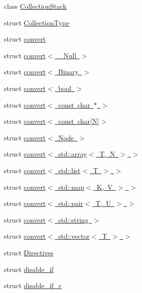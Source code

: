 \begin{DoxyCompactItemize}
class \mbox{\hyperlink{class_y_a_m_l_1_1_collection_stack}{Collection\+Stack}}
\item 
struct \mbox{\hyperlink{struct_y_a_m_l_1_1_collection_type}{Collection\+Type}}
\item 
struct \mbox{\hyperlink{struct_y_a_m_l_1_1convert}{convert}}
\item 
struct \mbox{\hyperlink{struct_y_a_m_l_1_1convert_3_01___null_01_4}{convert$<$ \+\_\+\+Null $>$}}
\item 
struct \mbox{\hyperlink{struct_y_a_m_l_1_1convert_3_01_binary_01_4}{convert$<$ Binary $>$}}
\item 
struct \mbox{\hyperlink{struct_y_a_m_l_1_1convert_3_01bool_01_4}{convert$<$ bool $>$}}
\item 
struct \mbox{\hyperlink{struct_y_a_m_l_1_1convert_3_01const_01char_01_5_01_4}{convert$<$ const char $\ast$ $>$}}
\item 
struct \mbox{\hyperlink{struct_y_a_m_l_1_1convert_3_01const_01char[_n]_4}{convert$<$ const char\mbox{[}\+N\mbox{]}$>$}}
\item 
struct \mbox{\hyperlink{struct_y_a_m_l_1_1convert_3_01_node_01_4}{convert$<$ Node $>$}}
\item 
struct \mbox{\hyperlink{struct_y_a_m_l_1_1convert_3_01std_1_1array_3_01_t_00_01_n_01_4_01_4}{convert$<$ std\+::array$<$ T, N $>$ $>$}}
\item 
struct \mbox{\hyperlink{struct_y_a_m_l_1_1convert_3_01std_1_1list_3_01_t_01_4_01_4}{convert$<$ std\+::list$<$ T $>$ $>$}}
\item 
struct \mbox{\hyperlink{struct_y_a_m_l_1_1convert_3_01std_1_1map_3_01_k_00_01_v_01_4_01_4}{convert$<$ std\+::map$<$ K, V $>$ $>$}}
\item 
struct \mbox{\hyperlink{struct_y_a_m_l_1_1convert_3_01std_1_1pair_3_01_t_00_01_u_01_4_01_4}{convert$<$ std\+::pair$<$ T, U $>$ $>$}}
\item 
struct \mbox{\hyperlink{struct_y_a_m_l_1_1convert_3_01std_1_1string_01_4}{convert$<$ std\+::string $>$}}
\item 
struct \mbox{\hyperlink{struct_y_a_m_l_1_1convert_3_01std_1_1vector_3_01_t_01_4_01_4}{convert$<$ std\+::vector$<$ T $>$ $>$}}
\item 
struct \mbox{\hyperlink{struct_y_a_m_l_1_1_directives}{Directives}}
\item 
struct \mbox{\hyperlink{struct_y_a_m_l_1_1disable__if}{disable\+\_\+if}}
\item 
struct \mbox{\hyperlink{struct_y_a_m_l_1_1disable__if__c}{disable\+\_\+if\+\_\+c}}
\item 

\end{DoxyCompactItemize}
